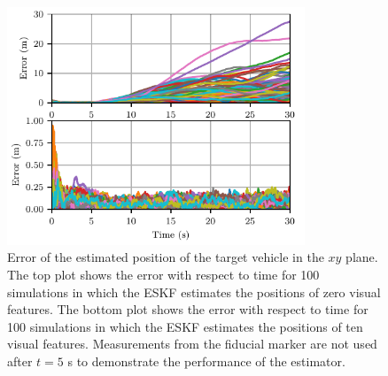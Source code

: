 \begin{figure}[htb]
  \centering
  \includegraphics[width=3.5in]{plots/mc_both_xy_err}
  \caption[Estimation Error for 100 Simulations]{Error of the estimated position of the target vehicle in the $xy$
    plane. The top plot shows the error with respect to time for 100 simulations in which the ESKF
    estimates the positions of zero visual features. The bottom plot shows the
    error with respect to time for 100 simulations in which the ESKF estimates
    the positions of ten
    visual features.
    Measurements from the fiducial marker are not used after $t = 5$ s to
    demonstrate the performance of the estimator.
}
  \label{fig:mc_xy_err}
\end{figure}

